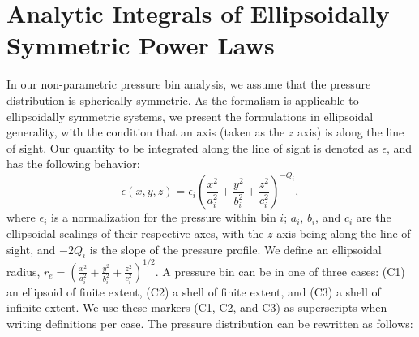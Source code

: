 \documentclass[twocolumn,traditabstract]{aa}
\begin{document}

\appendix

\section{Analytic Integrals of Ellipsoidally Symmetric Power Laws}
\label{sec:analytic_integrals}

In our non-parametric pressure bin analysis, we assume that the pressure distribution is spherically symmetric.
As the formalism is applicable to ellipsoidally symmetric systems, we present the formulations in ellipsoidal
generality, with the condition that an axis (taken as the $z$ axis) is along the line of sight.
Our quantity to be integrated along the line of sight is denoted as $\epsilon$, and has the
following behavior:
\begin{equation}
  \epsilon(x,y,z) = \epsilon_i (\frac{x^2}{a_i^2}+\frac{y^2}{b_i^2}+\frac{z^2}{c_i^2})^{-Q_i},
\end{equation}
where $\epsilon_i$ is a normalization for the pressure within bin $i$;
$a_i$, $b_i$, and $c_i$ are the ellipsoidal scalings of their respective axes,
with the $z$-axis being along the line of sight, and $-2Q_i$ is the slope of the pressure profile. We define an
ellipsoidal radius, $r_e = (\frac{x^2}{a_i^2}+\frac{y^2}{b_i^2}+\frac{z^2}{c_i^2})^{1/2}$.
A pressure bin can be in one of three cases: (C1) an ellipsoid of finite extent, (C2) a shell of
finite extent, and (C3) a shell of infinite extent. We use these markers (C1, C2, and C3) as superscripts
when writing definitions per case. The pressure distribution can be rewritten as follows:
\end{document}
